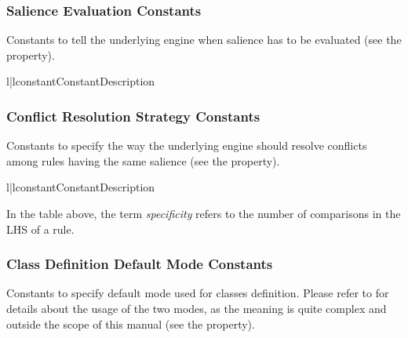 \subsubsection{Salience Evaluation Constants}

Constants to tell the underlying engine when salience has to be
evaluated (see the  property).

\begin{tableii}{l|l}{constant}{Constant}{Description}
\end{tableii}


\subsubsection{Conflict Resolution Strategy Constants}

Constants to specify the way the underlying engine should resolve
conflicts among rules having the same salience (see the
 property).

\begin{tableii}{l|l}{constant}{Constant}{Description}
\end{tableii}

In the table above, the term \emph{specificity} refers to the number
of comparisons in the LHS of a rule.


\subsubsection{Class Definition Default Mode Constants}

Constants to specify default mode used for classes definition. Please
refer to \clipsbpg{} for details about the usage of the two modes, as
the meaning is quite complex and outside the scope of this manual
(see the  property).

